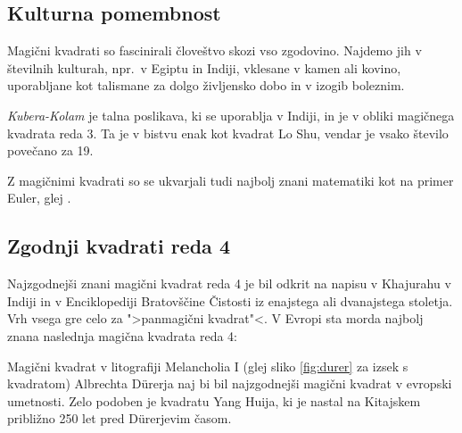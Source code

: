 \documentclass[a4paper,12pt]{article}
\begin{document}


\subsection{Kulturna pomembnost}

Magični kvadrati so fascinirali človeštvo skozi vso zgodovino. Najdemo jih
v številnih kulturah, npr.\ v Egiptu in Indiji, vklesane v kamen ali
kovino, uporabljane kot talismane za dolgo življensko dobo in v
izogib boleznim.

\emph{Kubera-Kolam} je talna poslikava, ki se uporablja v Indiji, in je v
obliki magičnega kvadrata reda 3. Ta je v bistvu enak kot kvadrat
Lo Shu, vendar je vsako število povečano za 19.


Z magičnimi kvadrati so se ukvarjali tudi najbolj znani matematiki kot na
primer Euler, glej \cite{euler}. %


\subsection{Zgodnji kvadrati reda 4}

Najzgodnejši znani magični kvadrat reda 4 je bil odkrit na napisu
v Khajurahu v Indiji in v Enciklopediji Bratovščine Čistosti iz enajstega
ali dvanajstega stoletja. Vrh vsega gre celo za ">panmagični kvadrat"<.
V Evropi sta morda najbolj znana naslednja magična kvadrata reda 4:

Magični kvadrat v litografiji Melancholia I (glej sliko \ref{fig:durer}
za izsek s kvadratom) Albrechta Dürerja naj bi bil najzgodnejši magični kvadrat
v evropski umetnosti. Zelo podoben je kvadratu Yang Huija, ki je nastal na Kitajskem
približno 250 let pred Dürerjevim časom. %
\end{document}
